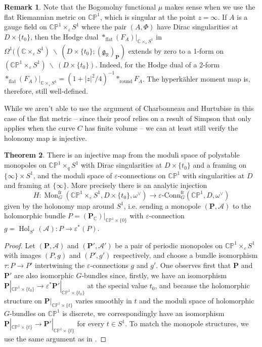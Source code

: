 \documentclass[11pt, oneside, reqno]{amsart}
\theoremstyle{definition} \newtheorem{definition}{Definition}[section]
\newtheorem{theorem}[definition]{Theorem}
\theoremstyle{definition} \newtheorem{remark}[definition]{Remark}
\theoremstyle{definition} \newtheorem{remarks}[definition]{Remarks}
\theoremstyle{definition} \newtheorem{question}[definition]{Question}
\theoremstyle{definition} \newtheorem*{note}{Note}
\theoremstyle{definition} \newtheorem{example}[definition]{Example}
\theoremstyle{definition} \newtheorem{examples}[definition]{Examples}
\renewcommand{\gg}{\mathfrak{g}}
\newcommand{\bb}[1]{\mathbb{#1}}
\newcommand{\mr}[1]{\mathrm{#1}}
\newcommand{\mc}[1]{\mathcal{#1}}
\newcommand{\bo}[1]{\boldsymbol{#1}}
\newcommand{\bs}{\ \backslash \ }
\newcommand{\CC}{\mathbb{C}}
\newcommand{\RR}{\mathbb{R}}
\newcommand{\eps}{\varepsilon}
\DeclareMathOperator{\mon}{Mon}
\DeclareMathOperator{\Hol}{Hol}
\newcommand{\epsconn}{\varepsilon\text{-Conn}}
\newcommand{\fr}{\mathrm{fr}}
\begin{document}
\begin{remark} \label{flat_metric_remark}
Note that the Bogomolny functional $\mu$ makes sense when we use the flat Riemannian metric on $\bb{CP}^1$, which is singular at the point $z = \infty$.  If $A$ is a gauge field on $\bb{CP}^1 \times_\eps S^1$ where the pair $(A,\Phi)$ have Dirac singularities at $D \times \{t_0\}$, then the Hodge dual $\ast_{\mr{flat}} (F_A)|_{\CC \times_\eps S^1}$ in $\Omega^1((\CC \times_\eps S^1) \bs (D \times \{t_0\}; (\gg_\RR)_{\bo P})$ extends by zero to a 1-form on $(\bb{CP}^1 \times_\eps S^1) \bs (D \times \{t_0\})$.  Indeed, for the Hodge dual of a 2-form $\ast_{\mr{flat}} (F_A)|_{\CC \times_\eps S^1} = (1+|z|^2/4)^{-1} \ast_{\mr{round}} F_A$.  The hyperk\"ahler moment map is, therefore, still well-defined.
\end{remark}

While we aren't able to use the argument of Charbonneau and Hurtubise in this case of the flat metric -- since their proof relies on a result of Simpson \cite{Simpson} that only applies when the curve $C$ has finite volume -- we can at least still verify the holonomy map is injective.

\begin{theorem} \label{monopole_qconn_comparison_thm}
There is an injective map from the moduli space of polystable monopoles on $\bb{CP}^1 \times_q S^1$ with Dirac singularities at $D \times \{t_0\}$ and a framing on $\{\infty\} \times S^1$, and the moduli space of $\eps$-connections on $\bb{CP}^1$ with singularities at $D$ and framing at $\{\infty\}$.  More precisely there is an analytic injection
\[H \colon \mon^{\fr}_G(\bb{CP}^1 \times_\eps S^1, D \times \{t_0\}, \omega^\vee) \to \epsconn_G^{\text{fr}}(\bb{CP}^1, D, \omega^\vee)\]
given by the holonomy map around $S^1$, i.e. sending a monopole $(\bo P, \mc A)$ to the holomorphic bundle $P = (\bo P_\CC)|_{\bb{CP}^1 \times \{0\}}$ with $\eps$-connection $g = \Hol_{S^1}(\mc A) \colon P \to \eps^*(P)$.
\end{theorem}

\begin{proof}
Let $(\bo P, \mc A)$ and $(\bo P', \mc A')$ be a pair of periodic monopoles on $\bb{CP}^1 \times_\eps S^1$ with images $(P,g)$ and $(P', g')$ respectively, and choose a bundle isomorphism $\tau \colon P \to P'$ intertwining the $\eps$-connections $g$ and $g'$.  One observes first that $\bo P$ and $\bo P'$ are also isomorphic $G$-bundles since, firstly, we have an isomorphism $\bo P|_{\bb{CP}^1 \times \{t_0\}} \to \eps^*\bo P'|_{\bb{CP}^1 \times \{t_0\}}$ at the special value $t_0$, and because the holomorphic structure on $\bo P|_{\bb{CP}^1 \times \{t\}}$ varies smoothly in $t$ and the moduli space of holomorphic $G$-bundles on $\bb{CP}^1$ is discrete, we correspondingly have an isomorphism $\bo P|_{\bb{CP}^1 \times \{t\}} \to \bo P'|_{\bb{CP}^1 \times \{t\}}$ for every $t \in S^1$.  To match the monopole structures, we use the same argument as in \cite[Proposition 5.6]{Smith}.
\end{proof}
\end{document}
